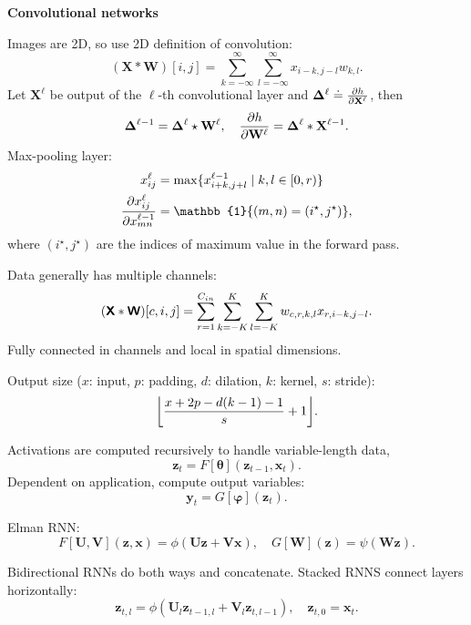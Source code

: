\documentclass[10pt]{article}
\newenvironment{topic}[1]
{\textbf{\sffamily \footnotesize \colorbox{black}{\rlap{\textbf{\textcolor{white}{#1}}}\hspace{\linewidth}\hspace{-2\fboxsep}}}}
{}
\newenvironment{subtopic}[1]
{\vspace{0.1cm} \begin{center}\textbf{\footnotesize \sffamily #1}\end{center}}
{}
\renewcommand{\mat}[1]{\ensuremath{\mathbf{#1}}}
\renewcommand{\vec}[1]{\ensuremath{\mathbold{#1}}}
\begin{document}
\begin{multicols*}{3}
\begin{topic}{Convolutional networks}
        \begin{subtopic}{Convolutional networks}
            Images are 2D, so use 2D definition of convolution: \[
                (\mat{X} * \mat{W})[i,j] = \sum_{k=-\infty}^{\infty} \sum_{l=-\infty}^{\infty} x_{i-k,j-l} w_{k,l}.
            \]
            Let $\mat{X}^{\ell}$ be output of the $\ell$-th convolutional layer and $\mat{\Delta}^{\ell} \doteq
                \pdv{h}{\mat{X}^{\ell}}$, then \[
                \mat{\Delta}^{\ell-1} = \mat{\Delta}^{\ell} \star \mat{W}^{\ell}, \quad \pdv{h}{\mat{W}^{\ell}} = \mat{\Delta}^{\ell} * \mat{X}^{\ell-1}.
            \]
            Max-pooling layer:
            \begin{align*}
                x^{\ell}_{ij}                        & = \max \{ x^{\ell-1}_{i+k,j+l} \mid k, l \in [0,r) \} \\
                \pdv{x_{ij}^{\ell}}{x^{\ell-1}_{mn}} & = \mathbb{1}\{ (m,n) = (i^\star,j^\star) \},
            \end{align*}
            where $(i^\star, j^\star)$ are the indices of maximum value in the forward pass.

            Data generally has multiple channels: \[
                (\bm{\mathsf{X}} * \bm{\mathsf{W}})[c,i,j] = \sum_{r=1}^{C_{in}} \sum_{k=-K}^{K} \sum_{l=-K}^{K} w_{c,r,k,l} x_{r,i-k,j-l}.
            \]
            Fully connected in channels and local in spatial dimensions.

            Output size ($x$: input, $p$: padding, $d$: dilation, $k$: kernel, $s$: stride): \[
                \lft\lfloor \frac{x+2p-d(k-1)-1}{s} + 1 \rgt\rfloor.
            \]
            
        \end{subtopic}

    \end{topic}

    \begin{topic}{Recurrent neural networks}
        Activations are computed recursively to handle variable-length data, \[
            \vec{z}_t = F[\vec{\theta}](\vec{z}_{t-1},\vec{x}_t).
        \]
        Dependent on application, compute output variables: \[
            \vec{y}_t = G[\vec{\varphi}](\vec{z}_t).
        \]

        Elman RNN: \[
            F[\mat{U},\mat{V}](\vec{z},\vec{x}) = \phi(\mat{U}\vec{z} + \mat{V}\vec{x}), \quad G[\mat{W}](\vec{z}) = \psi(\mat{W}\vec{z}).
        \]

        Bidirectional RNNs do both ways and concatenate. Stacked RNNS connect layers horizontally: \[
            \vec{z}_{t,l} = \phi(\mat{U}_l \vec{z}_{t-1,l} + \mat{V}_l \vec{z}_{t,l-1}), \quad \vec{z}_{t,0} = \vec{x}_t.
        \]


\end{topic}
\end{multicols*}
\end{document}
